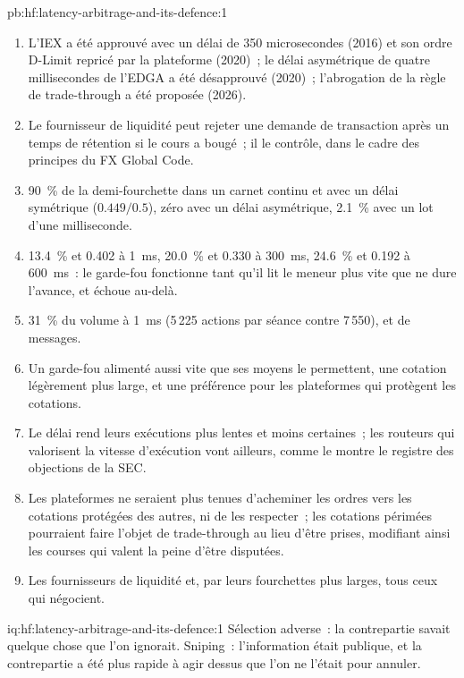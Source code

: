 \begin{solution}{pb:hf:latency-arbitrage-and-its-defence:1}
\begin{enumerate}
microsecondes et d'une milliseconde.
\item L'IEX a été approuvé avec un délai de 350 microsecondes (2016) et son ordre D-Limit repricé par la plateforme (2020)~; le délai asymétrique de quatre millisecondes de l'EDGA
a été désapprouvé (2020)~; l'abrogation de la règle de trade-through a été proposée (2026).
\item Le fournisseur de liquidité peut rejeter une demande de transaction après un temps de rétention si le cours a bougé~; il le contrôle, dans le cadre des
principes du FX Global Code.
\item 90~\% de la demi-fourchette dans un carnet continu et avec un délai symétrique ($0.449/0.5$), zéro avec un délai asymétrique, 2.1~\% avec un
lot d'une milliseconde.
\item 13.4~\% et 0.402 à 1~ms, 20.0~\% et 0.330 à 300~ms, 24.6~\% et 0.192 à 600~ms~: le garde-fou fonctionne tant qu'il lit le meneur plus vite que ne
dure l'avance, et échoue au-delà.
\item 31~\% du volume à 1~ms (5\,225 actions par séance contre 7\,550), et de messages.
\item Un garde-fou alimenté aussi vite que ses moyens le permettent, une cotation légèrement plus large, et une préférence pour les plateformes qui protègent les cotations.
\item Le délai rend leurs exécutions plus lentes et moins certaines~; les routeurs qui valorisent la vitesse d'exécution vont ailleurs, comme
le montre le registre des objections de la SEC.
\item Les plateformes ne seraient plus tenues d'acheminer les ordres vers les cotations protégées des autres, ni de les respecter~; les cotations périmées pourraient faire l'objet de trade-through au lieu d'être prises,
modifiant ainsi les courses qui valent la peine d'être disputées.
\item Les fournisseurs de liquidité et, par leurs fourchettes plus larges, tous ceux qui négocient.
\end{enumerate}
\end{solution}

\begin{solution}{iq:hf:latency-arbitrage-and-its-defence:1}
Sélection adverse~: la contrepartie savait quelque chose que l'on ignorait. Sniping~: l'information était publique, et la contrepartie a été plus rapide
à agir dessus que l'on ne l'était pour annuler.
\end{solution}

